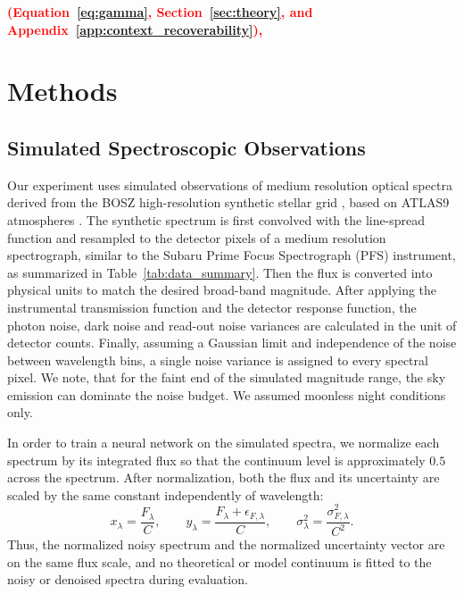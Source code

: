 \documentclass[twocolumn]{aastex7}
\newcommand{\ld}[1]{\textcolor{red}{\textbf{#1}}}
\begin{document}
\ld{(Equation~\ref{eq:gamma}, Section~\ref{sec:theory}, and Appendix~\ref{app:context_recoverability}), }

\section{Methods}
\label{sec:method}

\subsection{Simulated Spectroscopic Observations}
\label{sec:simulations}

Our experiment uses simulated observations of medium resolution optical spectra derived from the BOSZ high-resolution synthetic stellar grid \citep{Bohlin2017,Meszaros2012}, based on ATLAS9 atmospheres \citep{Kurucz1979}. The synthetic spectrum is first convolved with the line-spread function and resampled to the detector pixels of a medium resolution spectrograph, similar to the Subaru Prime Focus Spectrograph (PFS) instrument, as summarized in Table~\ref{tab:data_summary}. Then the flux is converted into physical units to match the desired broad-band magnitude. After applying the instrumental transmission function and the detector response function, the photon noise, dark noise and read-out noise variances are calculated in the unit of detector counts. Finally, assuming a Gaussian limit and independence of the noise between wavelength bins, a single noise variance is assigned to every spectral pixel. We note, that for the faint end of the simulated magnitude range, the sky emission can dominate the noise budget. We assumed moonless night conditions only.

In order to train a neural network on the simulated spectra, we normalize each spectrum by its integrated flux so that the continuum level is approximately $0.5$ across the spectrum. After normalization, both the flux and its uncertainty are scaled by the same constant independently of wavelength:
\begin{equation}
    x_{\lambda}=\frac{F_{\lambda}}{C},
    \qquad
    y_{\lambda}=\frac{F_{\lambda}+\epsilon_{F,\lambda}}{C},
    \qquad
    \sigma_{\lambda}^{2}
    =
    \frac{\sigma_{F,\lambda}^{2}}{C^{2}}.
    \label{eq:continuum_noise_scaling}
\end{equation}
Thus, the normalized noisy spectrum and the normalized uncertainty vector are on the same flux scale, and no theoretical or model continuum is fitted to the noisy or denoised spectra during evaluation.
\end{document}
